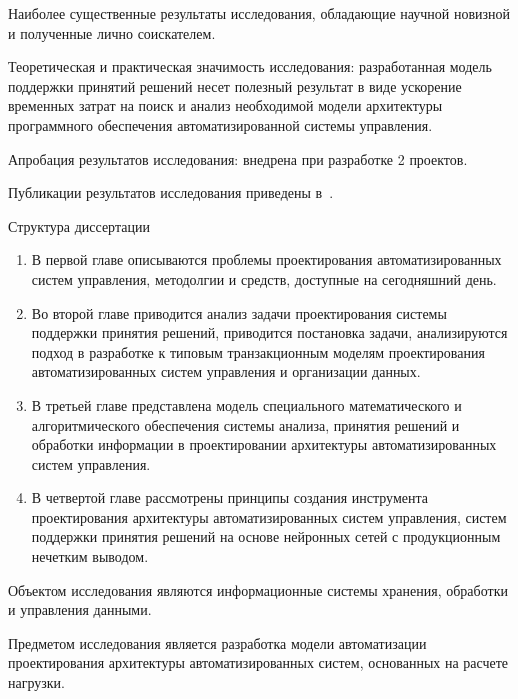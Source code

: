 Наиболее существенные результаты исследования, обладающие научной новизной и полученные лично соискателем.

Теоретическая и практическая значимость исследования: разработанная модель поддержки принятий решений несет полезный результат в виде ускорение временных затрат на поиск и анализ необходимой модели архитектуры программного обеспечения автоматизированной системы управления.

Апробация результатов исследования: внедрена при разработке 2 проектов. 

Публикации результатов исследования приведены в~\cite{aaij2022searches, baptista2021angular, leite2021observation,baptista2021searches,collaboration2021measurement,baptista2021measurement,aaij2021precision,aaij2022identification,bediaga2020measurement, aaij2021constraints,   onderwater2020study, aaij2022arxiv,     aaij2019arxiv,aaij2021evidence,aaij2020aps,baptista2021observation,baptista2021search,aaij2020isospin,  aaij2019precision,aaij2019search, lhcb2108evidence,aaij2022study,         aaij2022first,aaij2022j,  aaij2022observation, aaij2022tests}.


Структура диссертации
\begin{enumerate}
\item В первой главе описываются проблемы проектирования автоматизированных систем управления, методолгии и средств, доступные на сегодняшний день.
\item Во второй главе приводится анализ задачи проектирования системы поддержки принятия решений, приводится постановка задачи, анализируются подход в разработке к типовым транзакционным моделям проектирования автоматизированных систем управления и организации данных.
\item В третьей главе представлена  модель специального математического и алгоритмического обеспечения системы анализа, принятия решений и обработки информации в проектировании архитектуры
автоматизированных систем управления.
\item В четвертой главе рассмотрены принципы создания инструмента проектирования архитектуры автоматизированных систем управления, систем поддержки принятия решений на основе нейронных сетей с продукционным нечетким выводом.
\end{enumerate}



\ifsynopsis
Объектом исследования являются информационные системы хранения, обработки и управления данными.

Предметом исследования является разработка модели автоматизации проектирования архитектуры автоматизированных систем, основанных на расчете нагрузки.

